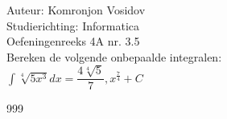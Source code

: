 \documentclass[a4paper]{article}
\newcommand{\dint}{\displaystyle\int}
\begin{document}
	
	\noindent \large Auteur: Komronjon Vosidov \\
	\noindent \large Studierichting: Informatica\\
	\noindent \large Oefeningenreeks 4A nr. 3.5\\
	
	
	\medskip
	\normalsize
	Bereken de volgende onbepaalde integralen:\\
	
	$ \dint \sqrt[4]{5x^3} dx = \dfrac{4 \sqrt[4]{5}}{7}, x^{\tfrac{7}{4}} + C $
	
	
	
\begin{thebibliography}{999}
\end{thebibliography}		
\end{document}

